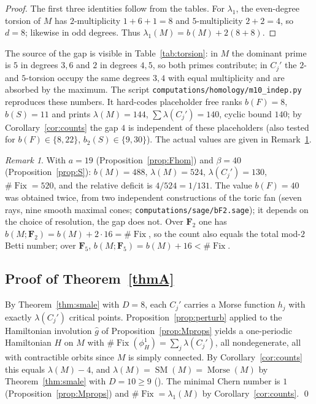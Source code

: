 \documentclass[11pt]{amsart}
\numberwithin{equation}{section}
\theoremstyle{definition}
\theoremstyle{remark}
\newtheorem{remark}[theorem]{Remark}
\newcommand{\F}{\mathbf F}
\DeclareMathOperator{\SM}{SM}
\DeclareMathOperator{\Morse}{Morse}
\DeclareMathOperator{\Fix}{Fix}
\begin{document}
\begin{proof}
The first three identities follow from the tables. For $\lambda_1$, the
even-degree torsion of $M$ has $2$-multiplicity $1+6+1=8$ and
$5$-multiplicity $2+2=4$, so $d=8$; likewise in odd degrees. Thus
$\lambda_1(M)=b(M)+2(8+8)$.
\end{proof}

The source of the gap is visible in Table~\ref{tab:torsion}: in $M$ the
dominant prime is $5$ in degrees $3,6$ and $2$ in degrees $4,5$, so both
primes contribute; in $C_j'$ the $2$- and $5$-torsion occupy the same
degrees $3,4$ with equal multiplicity and are absorbed by the maximum.
The script \nolinkurl{computations/homology/m10_indep.py} reproduces these
numbers. It hard-codes placeholder free ranks $b(F)=8$, $b(S)=11$ and
prints $\lambda(M)=144$, $\sum\lambda(C_j')=140$, cyclic bound $140$; by
Corollary~\ref{cor:counts} the gap $4$ is independent of these
placeholders (also tested for $b(F)\in\{8,22\}$, $b_2(S)\in\{9,30\}$).
The actual values are given in Remark~\ref{rem:absolute}.

\begin{remark}\label{rem:absolute}
With $a=19$ (Proposition~\ref{prop:Fhom}) and $\beta=40$
(Proposition~\ref{prop:S}): $b(M)=488$, $\lambda(M)=524$,
$\lambda(C_j')=130$, $\#\Fix=520$, and the relative deficit is
$4/524=1/131$. The value $b(F)=40$ was obtained twice, from two
independent constructions of the toric fan (seven rays, nine smooth
maximal cones; \nolinkurl{computations/sage/bF2.sage}); it depends on the
choice of resolution, the gap does not. Over $\F_2$ one has
$b(M;\F_2)=b(M)+2\cdot16=\#\Fix$, so the count also equals the total
mod-$2$ Betti number; over $\F_5$, $b(M;\F_5)=b(M)+16<\#\Fix$.
\end{remark}

\subsection{Proof of Theorem~\ref{thmA}}

By Theorem~\ref{thm:smale} with $D=8$, each $C_j'$ carries a Morse
function $h_j$ with exactly $\lambda(C_j')$ critical points.
Proposition~\ref{prop:perturb} applied to the
Hamiltonian involution $\hat g$ of Proposition~\ref{prop:Mprops} yields a
one-periodic Hamiltonian $H$ on $M$ with
$\#\Fix(\phi_H^1)=\sum_j\lambda(C_j')$, all nondegenerate, all with
contractible orbits since $M$ is simply connected. By
Corollary~\ref{cor:counts} this equals $\lambda(M)-4$, and
$\lambda(M)=\SM(M)=\Morse(M)$ by Theorem~\ref{thm:smale} with $D=10\ge9$
(\cite[Thm.~2.4]{OpenAI22}). The minimal Chern number is $1$
(Proposition~\ref{prop:Mprops}) and $\#\Fix=\lambda_1(M)$ by
Corollary~\ref{cor:counts}. \qed
\end{document}

